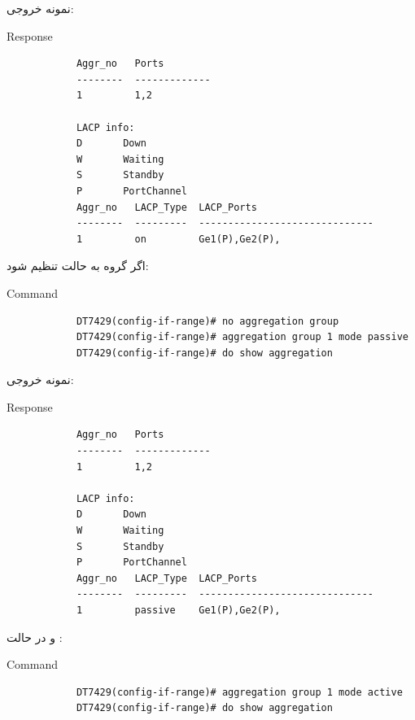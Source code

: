 \documentclass[11pt,letterpaper]{report}
\begin{document}
	نمونه خروجی:

	\begin{latin}
		\begin{cliexample}{Response}
			\begin{verbatim}
			Aggr_no   Ports
			--------  -------------
			1         1,2

			LACP info:
			D       Down
			W       Waiting
			S       Standby
			P       PortChannel
			Aggr_no   LACP_Type  LACP_Ports
			--------  ---------  ------------------------------
			1         on         Ge1(P),Ge2(P),
			\end{verbatim}
		\end{cliexample}
	\end{latin}

	اگر گروه به حالت  تنظیم شود:

	\begin{latin}
		\begin{cliexample}{Command}
			\begin{verbatim}
			DT7429(config-if-range)# no aggregation group
			DT7429(config-if-range)# aggregation group 1 mode passive
			DT7429(config-if-range)# do show aggregation
			\end{verbatim}
		\end{cliexample}
	\end{latin}

	نمونه خروجی:

	\begin{latin}
		\begin{cliexample}{Response}
			\begin{verbatim}
			Aggr_no   Ports
			--------  -------------
			1         1,2

			LACP info:
			D       Down
			W       Waiting
			S       Standby
			P       PortChannel
			Aggr_no   LACP_Type  LACP_Ports
			--------  ---------  ------------------------------
			1         passive    Ge1(P),Ge2(P),
			\end{verbatim}
		\end{cliexample}
	\end{latin}

	و در حالت :

	\begin{latin}
		\begin{cliexample}{Command}
			\begin{verbatim}
			DT7429(config-if-range)# aggregation group 1 mode active
			DT7429(config-if-range)# do show aggregation
			\end{verbatim}
		\end{cliexample}
	\end{latin}
\end{document}

